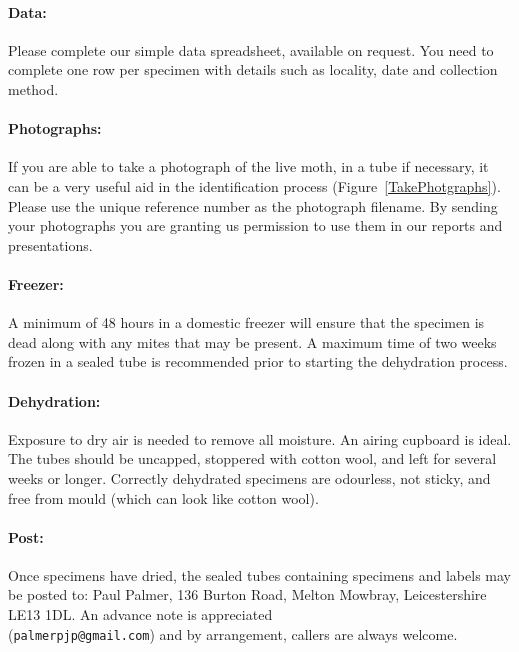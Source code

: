 \documentclass[12pt]{article}
\begin{document}
	\paragraph{Data:} Please complete our simple data spreadsheet, available on request. You need to complete one row per specimen with details such as locality, date and collection method. 

	\paragraph{Photographs:} If you are able to take a photograph of the live moth, in a tube if necessary, it can be a very useful aid in the identification process (Figure~\ref{TakePhotgraphs}).  Please use the unique reference number as the photograph filename. By sending your photographs you are granting us permission to use them in our reports and presentations.
	
	\paragraph{Freezer:} A minimum of 48 hours in a domestic freezer will ensure that the specimen is dead along with any mites that may be present. A maximum time of two weeks frozen in a sealed tube is recommended prior to starting the dehydration process.
	\paragraph{Dehydration:} Exposure to dry air is needed to remove all moisture. An airing cupboard is ideal. The tubes should be uncapped, stoppered with cotton wool, and left for several weeks or longer.  Correctly dehydrated specimens are odourless, not sticky, and free from mould (which can look like cotton wool).
	\paragraph{Post:} Once specimens have dried, the sealed tubes containing specimens and labels may be posted to: Paul Palmer, 136 Burton Road, Melton Mowbray, Leicestershire LE13 1DL. An advance note is appreciated \\ (\texttt{palmerpjp@gmail.com}) and by arrangement, callers are always welcome.
\end{document}
